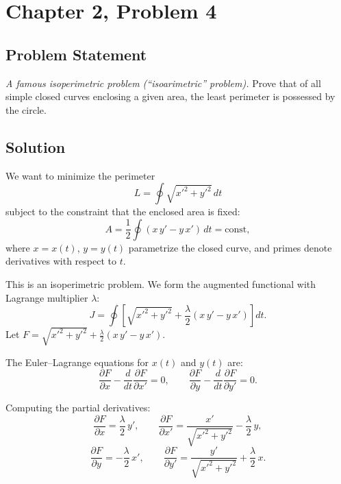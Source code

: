 \documentclass[12pt]{article}
\begin{document}
\section*{Chapter 2, Problem 4}

\subsection*{Problem Statement}
\textit{A famous isoperimetric problem (``isoarimetric'' problem).} Prove that of all simple closed curves enclosing a given area, the least perimeter is possessed by the circle.

\subsection*{Solution}

We want to minimize the perimeter
\[
  L = \oint \sqrt{x'^2 + y'^2}\,dt
\]
subject to the constraint that the enclosed area is fixed:
\[
  A = \frac{1}{2}\oint (x\,y' - y\,x')\,dt = \text{const},
\]
where $x = x(t)$, $y = y(t)$ parametrize the closed curve, and primes denote derivatives with respect to $t$.

This is an isoperimetric problem. We form the augmented functional with Lagrange multiplier $\lambda$:
\[
  J = \oint \left[\sqrt{x'^2 + y'^2} + \frac{\lambda}{2}(x\,y' - y\,x')\right] dt.
\]
Let $F = \sqrt{x'^2 + y'^2} + \frac{\lambda}{2}(x\,y' - y\,x')$.

The Euler--Lagrange equations for $x(t)$ and $y(t)$ are:
\[
  \frac{\partial F}{\partial x} - \frac{d}{dt}\frac{\partial F}{\partial x'} = 0,
  \qquad
  \frac{\partial F}{\partial y} - \frac{d}{dt}\frac{\partial F}{\partial y'} = 0.
\]

Computing the partial derivatives:
\[
  \frac{\partial F}{\partial x} = \frac{\lambda}{2}\,y', \qquad
  \frac{\partial F}{\partial x'} = \frac{x'}{\sqrt{x'^2+y'^2}} - \frac{\lambda}{2}\,y,
\]
\[
  \frac{\partial F}{\partial y} = -\frac{\lambda}{2}\,x', \qquad
  \frac{\partial F}{\partial y'} = \frac{y'}{\sqrt{x'^2+y'^2}} + \frac{\lambda}{2}\,x.
\]
\end{document}
